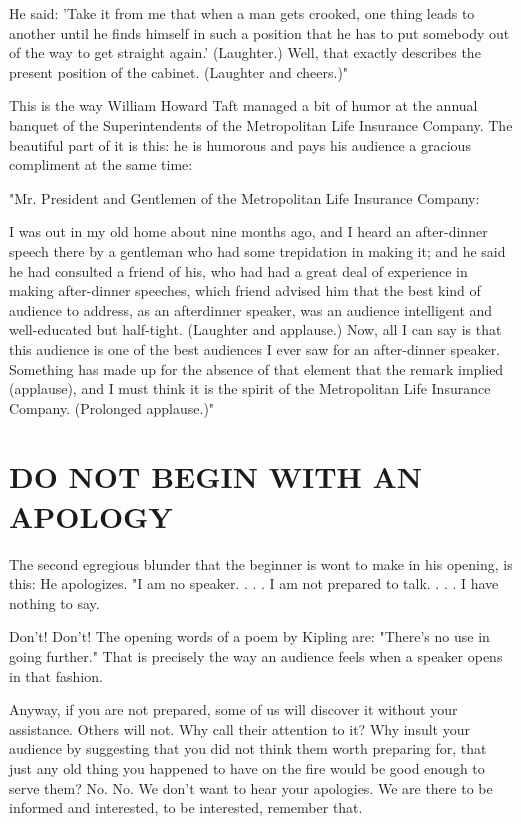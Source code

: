 \documentclass[10pt]{article}
\begin{document}
He said: 'Take it from me that when a man gets crooked, one thing leads to another until he finds himself in such a position that he has to put somebody out of the way to get straight again.' (Laughter.) Well, that exactly describes the present position of the cabinet. (Laughter and cheers.)"

This is the way William Howard Taft managed a bit of humor at the annual banquet of the Superintendents of the Metropolitan Life Insurance Company. The beautiful part of it is this: he is humorous and pays his audience a gracious compliment at the same time:

\begin{displayquote}
"Mr. President and Gentlemen of the Metropolitan Life Insurance Company:
\end{displayquote}

\begin{displayquote}
I was out in my old home about nine months ago, and I heard an after-dinner speech there by a gentleman who had some trepidation in making it; and he said he had consulted a friend of his, who had had a great deal of experience in making after-dinner speeches, which friend advised him that the best kind of audience to address, as an afterdinner speaker, was an audience intelligent and well-educated but half-tight. (Laughter and applause.) Now, all I can say is that this audience is one of the best audiences I ever saw for an after-dinner speaker. Something has made up for the absence of that element that the remark implied (applause), and I must think it is the spirit of the Metropolitan Life Insurance Company. (Prolonged applause.)"
\end{displayquote}

\section*{DO NOT BEGIN WITH AN APOLOGY}
The second egregious blunder that the beginner is wont to make in his opening, is this: He apologizes. "I am no speaker. . . . I am not prepared to talk. . . . I have nothing to say.

Don't! Don't! The opening words of a poem by Kipling are: "There's no use in going further." That is precisely the way an audience feels when a speaker opens in that fashion.

Anyway, if you are not prepared, some of us will discover it without your assistance. Others will not. Why call their attention to it? Why insult your audience by suggesting that you did not think them worth preparing for, that just any old thing you happened to have on the fire would be good enough to serve them? No. No. We don't want to hear your apologies. We are there to be informed and interested, to be interested, remember that.
\end{document}
